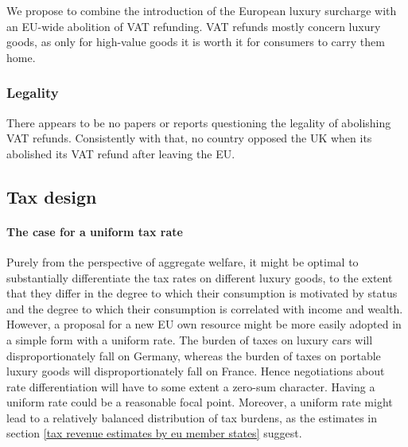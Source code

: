 \documentclass{article}
\begin{document}
We propose to combine the introduction of the European luxury surcharge with an EU-wide abolition of VAT refunding. VAT refunds mostly concern luxury goods, as only for high-value goods it is worth it for consumers to carry them home. 

\subsubsection{Legality}
There appears to be no papers or reports questioning the legality of abolishing VAT refunds. Consistently with that, no country opposed the UK when its abolished its VAT refund after leaving the EU.





\subsection{Tax design}

\paragraph{The case for a uniform tax rate}

Purely from the perspective of aggregate welfare, it might be optimal to substantially differentiate the tax rates on different luxury goods, to the extent that they differ in the degree to which their consumption is motivated by status and the degree to which their consumption is correlated with income and wealth. However, a proposal for %
a new EU own resource might be more easily adopted in a simple form with a uniform rate. The burden of taxes on luxury cars will disproportionately fall on Germany, whereas the burden of taxes on portable luxury goods will disproportionately fall on France. Hence negotiations about rate differentiation will have to some extent a zero-sum character. Having a uniform rate could be a reasonable focal point. Moreover, a uniform rate might lead to a relatively balanced distribution of tax burdens, as the estimates in section \ref{tax revenue estimates by eu member states} suggest.

\end{document}
